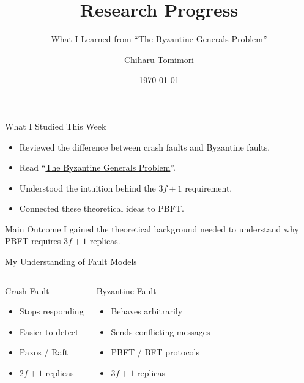 \documentclass[aspectratio=169]{beamer}
\title{Research Progress}
\subtitle{What I Learned from ``The Byzantine Generals Problem''}
\author{Chiharu Tomimori}
\date{\today}
\begin{document}
\begin{frame}
  \titlepage
\end{frame}

\begin{frame}{What I Studied This Week}
\begin{itemize}
  \item Reviewed the difference between crash faults and Byzantine faults.
  \item Read ``\href{https://lamport.azurewebsites.net/pubs/byz.pdf}{The Byzantine Generals Problem}''.
  \item Understood the intuition behind the \(3f+1\) requirement.
  \item Connected these theoretical ideas to PBFT.
\end{itemize}

\begin{block}{Main Outcome}
I gained the theoretical background needed to understand why PBFT requires \(3f+1\) replicas.
\end{block}
\end{frame}

\begin{frame}{My Understanding of Fault Models}
\begin{columns}
\begin{block}{Crash Fault}
\centering
{}

\begin{itemize}
  \item Stops responding
  \item Easier to detect
  \item Paxos / Raft
  \item \(2f+1\) replicas
\end{itemize}
\end{block}

\begin{alertblock}{Byzantine Fault}
\centering
{}

\begin{itemize}
  \item Behaves arbitrarily
  \item Sends conflicting messages
  \item PBFT / BFT protocols
  \item \(3f+1\) replicas
\end{itemize}
\end{alertblock}
\end{columns}
\end{frame}
\end{document}

